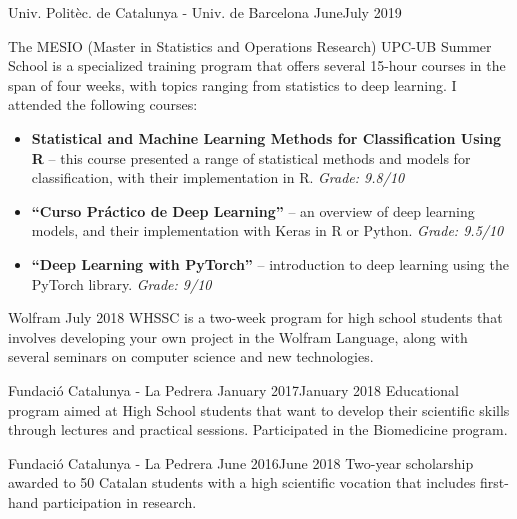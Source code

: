 \documentclass[a4paper, 11pt]{article}
\def\colratio{0.2}
\def\colsep{10pt}
\newenvironment{twocol}{%
    \columnratio{\colratio}%
    \setlength{\columnsep}{\colsep}%
    \begin{sloppypar}%
        \begin{paracol}{2}%
}{%
            \bigskip
        \end{paracol}%
    \end{sloppypar}%
}
\begin{document}
\begin{twocol}
    
    \switchcolumn
    
    \cvsectionrule
                 {Univ. Politèc. de Catalunya - Univ. de Barcelona}
                 {June}{July 2019}
                 {}
                 {The MESIO (Master in Statistics and Operations Research) UPC-UB Summer School is a specialized training program that offers several 15-hour courses in the span of four weeks, with topics ranging from statistics to deep learning. I attended the following courses:
                     \begin{itemize}
                         \item \textbf{Statistical and Machine Learning Methods for Classification Using R} -- this course presented a range of statistical methods and models for classification, with their implementation in R. \textit{Grade: 9.8/10}
                         \item \textbf{``Curso Práctico de Deep Learning''} -- an overview of deep learning models, and their implementation with Keras in R or Python. \textit{Grade: 9.5/10}
                         \item \textbf{``Deep Learning with PyTorch''} -- introduction to deep learning using the PyTorch library. \textit{Grade: 9/10}
                     \end{itemize}
                 }
     
                  {Wolfram}
                  {July 2018}{}{}
                  {WHSSC is a two-week program for high school students that involves developing your own project in the Wolfram Language, along with several seminars on computer science and new technologies.}
                  
     \smallskip
     {Fundació Catalunya - La Pedrera}
     {January 2017}{January 2018}{}
     {Educational program aimed at High School students that want to develop their scientific skills through lectures and practical sessions. Participated in the Biomedicine program.}
     
     \smallskip
     {Fundació Catalunya - La Pedrera}
     {June 2016}{June 2018}{}
     {Two-year scholarship awarded to 50 Catalan students with a high scientific vocation that includes first-hand participation in research.}
\end{twocol}
\end{document}

